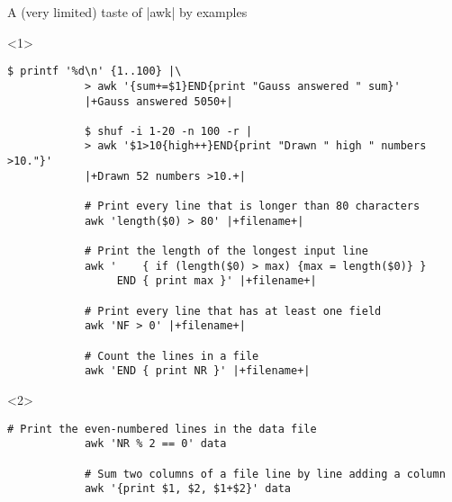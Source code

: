 \begin{frame}[fragile]{A (very limited) taste of \bash|awk| by examples}
    \vspace{-1mm}
    \begin{onlyenv}<1>
        \begin{lstlisting}[style=MyBash, numbers=none, xleftmargin=3mm, xrightmargin=3mm]
            $ printf '%d\n' {1..100} |\
            > awk '{sum+=$1}END{print "Gauss answered " sum}'
            |+Gauss answered 5050+|

            $ shuf -i 1-20 -n 100 -r |
            > awk '$1>10{high++}END{print "Drawn " high " numbers >10."}'
            |+Drawn 52 numbers >10.+|

            # Print every line that is longer than 80 characters
            awk 'length($0) > 80' |+filename+|

            # Print the length of the longest input line
            awk '    { if (length($0) > max) {max = length($0)} }
                 END { print max }' |+filename+|

            # Print every line that has at least one field
            awk 'NF > 0' |+filename+|

            # Count the lines in a file
            awk 'END { print NR }' |+filename+|
        \end{lstlisting}
    \end{onlyenv}
    \begin{onlyenv}<2>
        \begin{lstlisting}[style=MyBash, numbers=none, xleftmargin=3mm, xrightmargin=3mm, belowskip=-3mm]
            # Print the even-numbered lines in the data file
            awk 'NR % 2 == 0' data

            # Sum two columns of a file line by line adding a column
            awk '{print $1, $2, $1+$2}' data


\end{lstlisting}
\end{onlyenv}
\end{frame}
